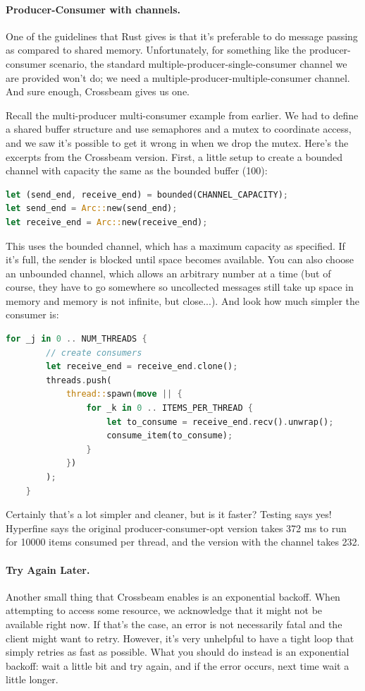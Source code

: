 \documentclass[a4paper]{report}
\begin{document}
\paragraph{Producer-Consumer with channels.} One of the guidelines that Rust gives is that it's preferable to do message passing as compared to shared memory. Unfortunately, for something like the producer-consumer scenario, the standard multiple-producer-single-consumer channel we are provided won't do; we need a multiple-producer-multiple-consumer channel. And sure enough, Crossbeam gives us one. 

Recall the multi-producer multi-consumer example from earlier. We had to define a shared buffer structure and use semaphores and a mutex to coordinate access, and we saw it's possible to get it wrong in when we drop the mutex. Here's the excerpts from the Crossbeam version. First, a little setup to create a bounded channel with capacity the same as the bounded buffer (100): 

\begin{lstlisting}[language=Rust]
let (send_end, receive_end) = bounded(CHANNEL_CAPACITY);
let send_end = Arc::new(send_end);
let receive_end = Arc::new(receive_end);
\end{lstlisting}

This uses the bounded channel, which has a maximum capacity as specified. If it's full, the sender is blocked until space becomes available. You can also choose an unbounded channel, which allows an arbitrary number at a time (but of course, they have to go somewhere so uncollected messages still take up space in memory and memory is not infinite, but close...).
And look how much simpler the consumer is:
\begin{lstlisting}[language=Rust]
    for _j in 0 .. NUM_THREADS {
        // create consumers
        let receive_end = receive_end.clone();
        threads.push(
            thread::spawn(move || {
                for _k in 0 .. ITEMS_PER_THREAD {
                    let to_consume = receive_end.recv().unwrap();
                    consume_item(to_consume);
                }
            })
        );
    }
\end{lstlisting}

Certainly that's a lot simpler and cleaner, but is it faster? Testing says yes! Hyperfine says the original producer-consumer-opt version takes 372 ms to run for 10000 items consumed per thread, and the version with the channel takes 232. 

\paragraph{Try Again Later.}
Another small thing that Crossbeam enables is an exponential backoff. When attempting to access some resource, we acknowledge that it might not be available right now. If that's the case, an error is not necessarily fatal and the client might want to retry. However, it's very unhelpful to have a tight loop that simply retries as fast as possible. What you should do instead is an exponential backoff: wait a little bit and try again, and if the error occurs, next time wait a little longer.
\end{document}
